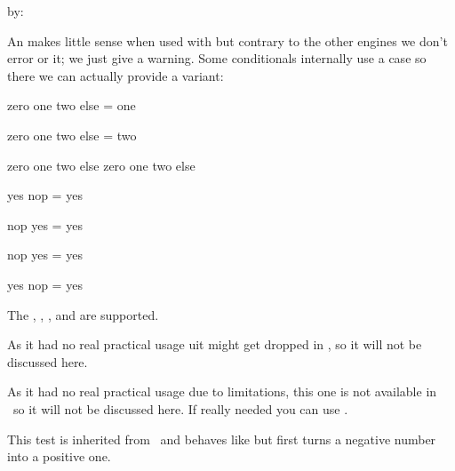 by:

\starttyping[option=TEX]
\unless\ifdim\scratchdimen>10pt
    \dosomething
\fi
\stoptyping

An \type {\unless} makes little sense when used with \type {\ifcase} but contrary
to the other engines we don't error or it; we just give a warning. Some
conditionals internally use a case so there we can actually provide a variant:

\startbuffer
{} \relax zero \or one \or two \else else \fi = one \par
{} \relax zero \or one \or two \else else \fi = two \par

\unless{} \relax zero \or one \or two \else else \fi %
\unless{} \relax zero \or one \or two \else else \fi %

\or yes \else nop \fi = yes \par
{}  \or nop \else yes \fi = yes \par

\unless{}\or nop \else yes \fi = yes \par
\unless{}  \or yes \else nop \fi = yes \par
\stopbuffer

\typebuffer[option=TEX]

The \typ {\ifchkdim}, \typ {\ifchkdimension}, \typ {\ifchknum}, \typ
{\ifchknumber} and \typ {\ifparameter} are supported.

\startpacked \getbuffer \stoppacked

\stopsectionlevel

\stopsectionlevel

\startsectionlevel[title={\LUATEX\ primitives}]

\startsectionlevel[title={\tex{ifincsname}}]

As it had no real practical usage uit might get dropped in \LUAMETATEX, so it
will not be discussed here.

\stopsectionlevel

\startsectionlevel[title={\tex{ifprimitive}}]

As it had no real practical usage due to limitations, this one is not available
in \LUAMETATEX\ so it will not be discussed here. If really needed you can use \type
{\ifflags}.

\stopsectionlevel

\startsectionlevel[title={\tex{ifabsnum}}]

This test is inherited from \PDFTEX\ and behaves like \type {\ifnum} but first
turns a negative number into a positive one.

